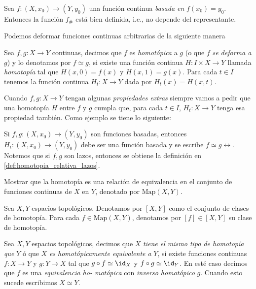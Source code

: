     \begin{prop}
        Sea $f:(X,x_0)\to(Y,y_0)$ una función continua \textit{basada en} $f(x_0)=y_0$. Entonces la función $f_\#$ está bien definida, i.e., no depende del representante.
    \end{prop}
    \begin{dem}
        
    \end{dem}
    Podemos deformar funciones continuas arbitrarias de la siguiente manera 
    \begin{definicion}
        Sea $f,g:X\to Y$ continuas, decimos que $f$ es \textit{homotópica} a $g$ (o que $f$ \textit{se deforma a} $g$) y lo denotamos por $f\simeq g$, si existe una función continua $H:I\times X\to Y$ llamada \textit{homotopía} tal que $H(x,0)=f(x)$ y $H(x,1)=g(x)$. Para cada $t\in I$ tenemos la función continua $H_t:X\to Y$ dada por $H_t(x)=H(x,t)$.
    \end{definicion}
    \begin{nota}
        Cuando $f,g:X\to Y$ tengan algunas \textit{propiedades extras} siempre vamos a pedir que una homotopía $H$ entre $f$ y $g$ cumpla que, para cada $t\in I$, $H_t:X\to Y$ tenga esa propiedad también. Como ejemplo se tiene lo siguiente:
        
        Si $f,g:(X,x_0)\to (Y,y_0)$ son funciones basadas, entonces $H_t:(X,x_0)\to(Y,y_0)$ debe ser una función basada y se escribe $f\simeq g\rel$. Notemos que si $f,g$ son lazos, entonces se obtiene la definición en \ref{def:homotopia_relativa_lazos}.
    \end{nota}
    \begin{ejercicio}
        Mostrar que la homotopía es una relación de equivalencia en el conjunto de funciones continuas de $X$ en $Y$, denotado por $\text{Map}(X,Y)$.
    \end{ejercicio}
    \begin{definicion}
        Sea $X,Y$ espacios topológicos. Denotamos por $[X,Y]$ como el conjunto de clases de homotopía. Para cada $f\in \text{Map}(X,Y)$, denotamos por $[f]\in [X,Y]$ su clase de homotopía.
    \end{definicion}
    \begin{definicion}
        Sea $X,Y$ espacios topológicos, decimos que $X$ \textit{tiene el mismo tipo de homotopía que} $Y$ ó que $X$ \textit{es homotópicamente equivalente a} $Y$, si existe funciones continuas $f:X\to Y$ y $g:Y\to X$ tal que $g\circ f\simeq \id_X$ y $f\circ g\simeq \id_Y$. En esté caso decimos que $f$ es una \textit{equivalencia ho- motópica} con \textit{inverso homotópico} $g$. Cuando esto sucede escribimos $X\simeq Y.$
    \end{definicion}
